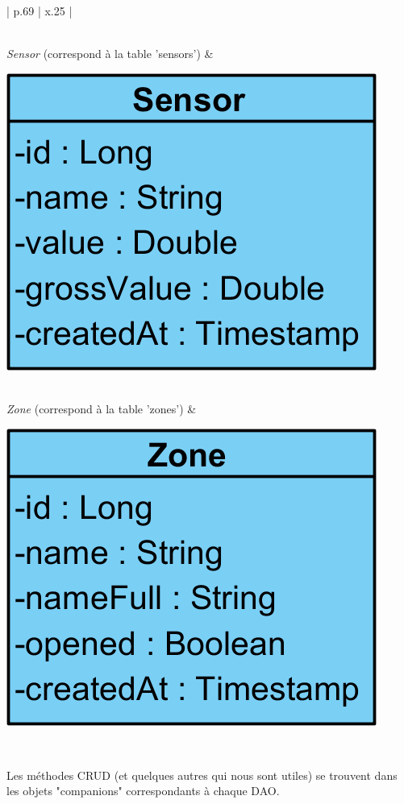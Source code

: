 \begin{center}
{\begin{longtable}{| p{.69\textwidth} | x{.25\textwidth} |}
\begin{minipage}{\linewidth}
        \vspace{12pt}
    \end{minipage}\\
    \hline
    \emph{Sensor} (correspond à la table 'sensors') &
    \begin{minipage}{\linewidth}
        \centering
        \vspace{12pt}
        \includegraphics[scale=0.8]{img/sensor}\par
        \vspace{12pt}
    \end{minipage}\\
    \hline
    \emph{Zone} (correspond à la table 'zones') &
    \begin{minipage}{\linewidth}
        \centering
        \vspace{12pt}
        \includegraphics[scale=0.8]{img/zone}\par
        \vspace{12pt}
    \end{minipage}\\
    \hline
    \caption{Entités de la base de données}
\end{longtable}}
\end{center}
\vspace*{-0.7cm}
Les méthodes CRUD (et quelques autres qui nous sont utiles) se trouvent dans les objets "companions" correspondants à chaque DAO.